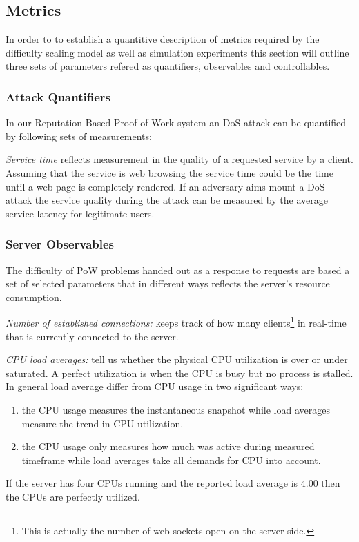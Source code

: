 \subsection{Metrics}
In order to to establish a quantitive description of metrics required by the difficulty scaling model as well as simulation experiments
 this section will outline three sets of parameters refered as quantifiers, observables and controllables. 

\subsubsection{Attack Quantifiers}
In our Reputation Based Proof of Work system an DoS attack can be quantified by following sets of measurements: 

\emph{Service time} reflects measurement in the quality of a requested service by a client. Assuming that the service is web browsing the service time could be the time until a web page is completely rendered. If an adversary aims mount a DoS attack the service quality during the attack can be measured by the average service latency for legitimate users. 

\subsubsection{Server Observables}
The difficulty of PoW problems handed out as a response to requests are based a set of selected parameters that in different ways reflects the server's resource consumption.

\emph{Number of established connections:} keeps track of how many clients\footnote{This is actually the number of web sockets open on the server side.} in real-time that is currently connected to the server.

\emph{CPU load averages:} tell us whether the physical CPU utilization is over or under saturated. A perfect utilization is when the CPU is busy but no process is stalled. In general load average differ from CPU usage in two significant ways:
\begin{enumerate}
\item the CPU usage measures the instantaneous snapshot while load averages measure the trend in CPU utilization.
\item the CPU usage only measures how much was active during measured timeframe while load averages take all demands for CPU into account.
\end{enumerate}
If the server has four CPUs running and the reported load average is 4.00 then the CPUs are perfectly utilized\cite{cpu}.

